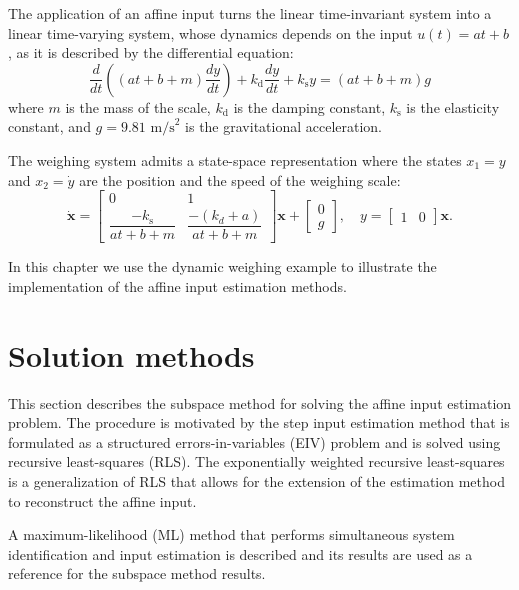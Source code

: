 The application of an affine input turns the linear time-invariant system into a linear time-varying system, whose
dynamics depends on the input $u(t) = {a} t + {b}$, as it is described by the differential equation:
\begin{equation} \dfrac{d}{dt} \left( \left( {a} t + {b} + m \right) \dfrac{dy}{dt} \right) + k_{\mathrm{d}} \dfrac{dy}{dt} + k_{\mathrm{s}} y = \left( {a} t + {b} + m \right) g \end{equation}
where $m$ is the mass of the scale, $k_{\mathrm{d}}$ is the damping constant, $k_{\mathrm{s}}$ is the elasticity constant, and $g = 9.81$ $\mathrm{m/s}^2$ is the gravitational acceleration. 

The weighing system admits a state-space representation where the states $x_1=y$ and $x_2=\dot{y}$ are the position and the speed of the weighing scale: 
\begin{equation} \dot{\mathbf{x}} = \begin{bmatrix} 0 & 1 \\ \dfrac{-k_{\mathrm{s}}}{{a} t + {b} + m} & \dfrac{-(k_{{d}} + {a})}{{a} t + {b} + m} \end{bmatrix} \mathbf{x} + \begin{bmatrix} 0 \\ g \end{bmatrix}, \quad y = \begin{bmatrix} 1 & 0  \end{bmatrix} \mathbf{x} . \label{eqn:ltvsystem} \end{equation}

In this chapter we use the dynamic weighing example to illustrate the implementation of the affine input estimation methods.


\section{Solution methods}

This section describes the subspace method for solving the affine input estimation problem.
The procedure is motivated by the step input estimation method that is formulated as a structured errors-in-variables (EIV) problem and is solved using recursive least-squares (RLS).
The exponentially weighted recursive least-squares is a generalization of RLS that allows for the extension of the estimation method to reconstruct the affine input.

A maximum-likelihood (ML) method that performs simultaneous system identification and input estimation is described and its results are used as a reference for the subspace method results.

